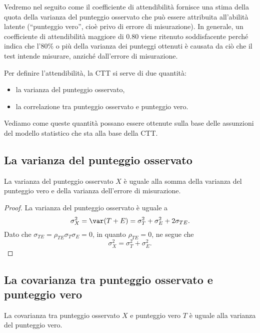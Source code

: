 Vedremo nel seguito come il coefficiente di attendibilità fornisce una stima della quota della varianza del punteggio osservato che può essere attribuita all'abilità latente (``punteggio vero'', cioè privo di errore di misurazione). 
In generale, un coefficiente di attendibilità maggiore di 0.80 viene ritenuto soddisfacente perché indica che l'80\% o più della varianza dei punteggi ottenuti è causata da ciò che il test intende misurare, anziché dall'errore di misurazione.

Per definire l'attendibilità, la CTT si serve di due quantità: 
\begin{itemize}
\item la varianza del punteggio osservato,
\item la correlazione tra punteggio osservato e punteggio vero. 
\end{itemize}
Vediamo come queste quantità possano essere ottenute sulla base delle assunzioni del modello statistico che sta alla base della CTT.

\subsection{La varianza del punteggio osservato}

La varianza del punteggio osservato $X$ è uguale alla somma della varianza del punteggio vero e della varianza dell'errore di misurazione.

\begin{proof}
La varianza del punteggio osservato è uguale a
\begin{equation}
\sigma^2_X =  \var(T+E) =  \sigma_T^2 + \sigma_E^2 + 2 \sigma_{TE}.\notag
\label{eq:3_2_4}
\end{equation}
Dato che $\sigma_{TE}=\rho_{TE}\sigma_T \sigma_E=0$, in quanto $\rho_{TE}=0$, ne segue che
\begin{equation}
\sigma^2_X =   \sigma_T^2 + \sigma_E^2.
\label{eq:var_sum}
\end{equation}
\end{proof}


\subsection{La covarianza tra punteggio osservato e punteggio vero}

La covarianza tra punteggio osservato $X$ e punteggio vero $T$ è uguale alla varianza del punteggio vero.

